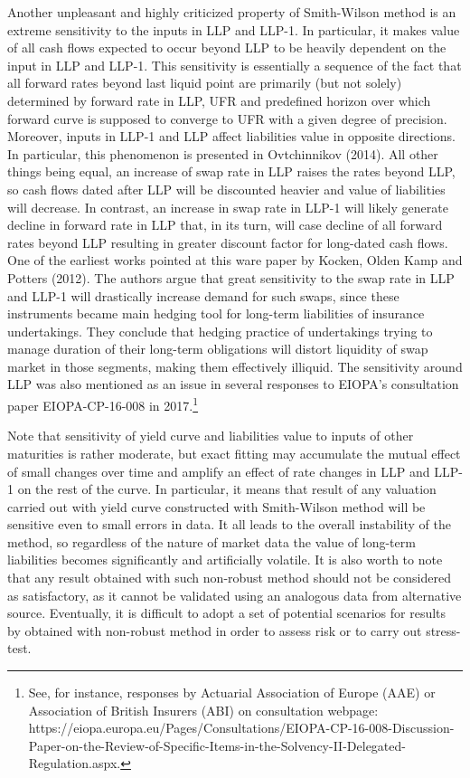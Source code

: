 	Another unpleasant and highly criticized property of Smith-Wilson method is an extreme sensitivity to the inputs in LLP and LLP-1.
	In particular, it makes value of all cash flows expected to occur beyond LLP to be heavily dependent on the input in LLP and LLP-1.
	This sensitivity is essentially a sequence of the fact that all forward rates beyond last liquid point are primarily (but not solely) determined by forward rate in LLP,  UFR and predefined horizon over which forward curve is supposed to converge to UFR with a given degree of precision.
	Moreover, inputs in LLP-1 and LLP affect liabilities value in opposite directions. 
	In particular, this phenomenon is presented in Ovtchinnikov (2014).
	All other things being equal, an increase of swap rate in LLP raises the rates beyond LLP, so cash flows dated after LLP will be discounted heavier and value of liabilities will decrease.
	In contrast, an increase in swap rate in LLP-1 will  likely generate decline in forward rate in LLP that, in its turn, will case decline of all forward rates beyond LLP resulting in greater discount factor for long-dated cash flows.
	One of the earliest works pointed at this ware paper by Kocken, Olden Kamp and  Potters (2012).
	The authors argue that great sensitivity to the swap rate in LLP and LLP-1 will drastically increase demand for such swaps, since these instruments became main hedging tool for long-term liabilities of insurance undertakings. 
	They conclude that hedging practice of undertakings trying to manage duration of their long-term obligations will distort liquidity of swap market in those segments, making them effectively illiquid.
	The sensitivity around LLP was also mentioned as an issue in several responses  to EIOPA's consultation paper EIOPA-CP-16-008 in 2017.\footnote
	{
	See, for instance, responses by Actuarial Association of Europe (AAE) or Association of British Insurers (ABI) on consultation webpage: https://eiopa.europa.eu/Pages/Consultations/EIOPA-CP-16-008-Discussion-Paper-on-the-Review-of-Specific-Items-in-the-Solvency-II-Delegated-Regulation.aspx.
	}
	
	Note that sensitivity of yield curve and liabilities value to inputs of other maturities is rather moderate, but exact fitting may accumulate the mutual effect of small changes over time and amplify an effect of rate changes in LLP and LLP-1 on the rest of the curve. 
	In particular, it means that result of any valuation carried out with yield curve constructed with Smith-Wilson method will be sensitive even to small errors in data.
	 It all leads to the overall instability of the method, so regardless of the nature of market data the value of long-term liabilities becomes significantly and artificially volatile. 
	It is also worth to note that any result obtained with such non-robust method should not be considered as satisfactory, as it cannot be validated using an analogous data from alternative source.
	{\color{red}Eventually, it is difficult to adopt a set of potential scenarios for results by obtained with non-robust method in order to assess risk or to carry out stress-test.}
	
